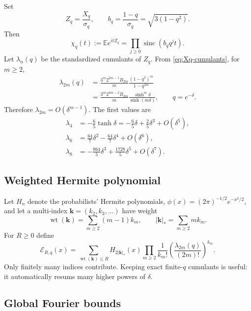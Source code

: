 \documentclass[11pt,a4paper]{article}
\theoremstyle{definition}
\newcommand{\E}{\mathbb{E}}
\newcommand{\sinc}{\operatorname{sinc}}
\newcommand{\wt}{\operatorname{wt}}
\newcommand{\1}{\mathbf{1}}
\begin{document}
Set
\begin{equation}
 Z_q=\frac{X_q}{\sigma_q},
 \qquad b_q=\frac{1-q}{\sigma_q}=\sqrt{3(1-q^2)}.
 \label{eq:Zq-bq}
\end{equation}
Then
\begin{equation}
 \chi_q(t):=\E e^{itZ_q}
 =\prod_{j\ge0}\sinc(b_qq^jt).
 \label{eq:standardized-cf}
\end{equation}
Let $\lambda_n(q)$ be the standardized cumulants of $Z_q$.  From
\eqref{eq:Xq-cumulants}, for $m\ge2$,
\begin{align}
 \lambda_{2m}(q)
 &=\frac{3^m2^{2m-1}B_{2m}}{m}
   \frac{(1-q^2)^m}{1-q^{2m}}
 \label{eq:lambda-q}\\
 &=\frac{3^m2^{3m-2}B_{2m}}{m}
   \frac{\sinh^m\delta}{\sinh(m\delta)},
 \qquad q=e^{-\delta}.
 \label{eq:lambda-delta}
\end{align}
Therefore $\lambda_{2m}=O(\delta^{m-1})$.  The first values are
\begin{align}
 \lambda_4&=-\frac65\tanh\delta
 =-\frac65\delta+\frac25\delta^3+O(\delta^5),
 \label{eq:lambda4}\\
 \lambda_6&=\frac{64}{7}\delta^2-\frac{64}{7}\delta^4+O(\delta^6),
 \label{eq:lambda6}\\
 \lambda_8&=-\frac{864}{5}\delta^3+\frac{1728}{5}\delta^5+O(\delta^7).
 \label{eq:lambda8}
\end{align}

\subsection{Weighted Hermite polynomial}

Let $H_n$ denote the probabilists' Hermite polynomials,
$\phi(x)=(2\pi)^{-1/2}e^{-x^2/2}$, and let a multi-index
$\bm{k}=(k_2,k_3,\ldots)$ have weight
\begin{equation}
 \wt(\bm{k})=\sum_{m\ge2}(m-1)k_m,
 \qquad
 |\bm{k}|_*=\sum_{m\ge2}mk_m.
 \label{eq:edgeworth-weight}
\end{equation}
For $R\ge0$ define
\begin{equation}
 \mathcal E_{R,q}(x)=
 \sum_{\wt(\bm{k})\le R}
 H_{2|\bm{k}|_*}(x)
 \prod_{m\ge2}\frac1{k_m!}
 \left(\frac{\lambda_{2m}(q)}{(2m)!}\right)^{k_m}.
 \label{eq:edgeworth-polynomial}
\end{equation}
Only finitely many indices contribute.  Keeping exact finite-$q$ cumulants is
useful: it automatically resums many higher powers of $\delta$.

\subsection{Global Fourier bounds}
\end{document}
